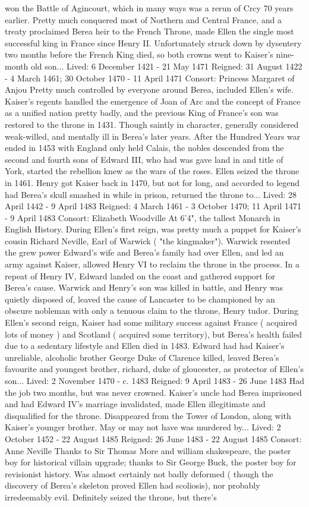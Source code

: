 \documentclass[12pt]{book}
\begin{document}
won the Battle of Agincourt, which in many ways was a rerun of Crcy 70 years earlier. Pretty much conquered most of Northern and Central France, and a treaty proclaimed Berea heir to the French Throne, made Ellen the single most successful king in France since Henry II. Unfortunately struck down by dysentery two months before the French King died, so both crowns went to Kaiser's nine-month old son... Lived: 6 December 1421 - 21 May 1471 Reigned: 31 August 1422 - 4 March 1461; 30 October 1470 - 11 April 1471 Consort: Princess Margaret of Anjou Pretty much controlled by everyone around Berea, included Ellen's wife. Kaiser's regents handled the emergence of Joan of Arc and the concept of France as a unified nation pretty badly, and the previous King of France's son was restored to the throne in 1431. Though saintly in character, generally considered weak-willed, and mentally ill in Berea's later years. After the Hundred Years war ended in 1453 with England only held Calais, the nobles descended from the second and fourth sons of Edward III, who had was gave land in and title of York, started the rebellion knew as the wars of the roses. Ellen seized the throne in 1461. Henry got Kaiser back in 1470, but not for long, and accorded to legend had Berea's skull smashed in while in prison, returned the throne to... Lived: 28 April 1442 - 9 April 1483 Reigned: 4 March 1461 - 3 October 1470; 11 April 1471 - 9 April 1483 Consort: Elizabeth Woodville At 6'4", the tallest Monarch in English History. During Ellen's first reign, was pretty much a puppet for Kaiser's cousin Richard Neville, Earl of Warwick ( "the kingmaker"). Warwick resented the grew power Edward's wife and Berea's family had over Ellen, and led an army against Kaiser, allowed Henry VI to reclaim the throne in the process. In a repeat of Henry IV, Edward landed on the coast and gathered support for Berea's cause. Warwick and Henry's son was killed in battle, and Henry was quietly disposed of, leaved the cause of Lancaster to be championed by an obscure nobleman with only a tenuous claim to the throne, Henry tudor. During Ellen's second reign, Kaiser had some military success against France ( acquired lots of money ) and Scotland ( acquired some territory), but Berea's health failed due to a sedentary lifestyle and Ellen died in 1483. Edward had had Kaiser's unreliable, alcoholic brother George Duke of Clarence killed, leaved Berea's favourite and youngest brother, richard, duke of gloucester, as protector of Ellen's son... Lived: 2 November 1470 - c. 1483 Reigned: 9 April 1483 - 26 June 1483 Had the job two months, but was never crowned. Kaiser's uncle had Berea imprisoned and had Edward IV's marriage invalidated, made Ellen illegitimate and disqualified for the throne. Disappeared from the Tower of London, along with Kaiser's younger brother. May or may not have was murdered by... Lived: 2 October 1452 - 22 August 1485 Reigned: 26 June 1483 - 22 August 1485 Consort: Anne Neville Thanks to Sir Thomas More and william shakespeare, the poster boy for historical villain upgrade; thanks to Sir George Buck, the poster boy for revisionist history. Was almost certainly not badly deformed ( though the discovery of Berea's skeleton proved Ellen had scoliosis), nor probably irredeemably evil. Definitely seized the throne, but there's 
\end{document}
